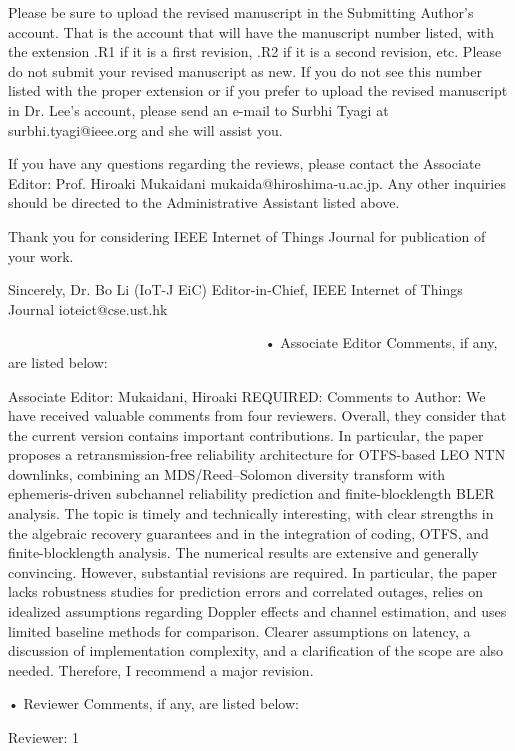 Please be sure to upload the revised manuscript in the Submitting Author's account.  That is the account that will have the manuscript number listed, with the extension .R1 if it is a first revision, .R2 if it is a second revision, etc.  Please do not submit your revised manuscript as new.  If you do not see this number listed with the proper extension or if you prefer to upload the revised manuscript in Dr. Lee's account, please send an e-mail to Surbhi Tyagi at surbhi.tyagi@ieee.org and she will assist you.

If you have any questions regarding the reviews, please contact the Associate Editor: Prof. Hiroaki Mukaidani mukaida@hiroshima-u.ac.jp. Any other inquiries should be directed to the Administrative Assistant listed above.

Thank you for considering IEEE Internet of Things Journal for publication of your work.

Sincerely,
Dr. Bo Li (IoT-J EiC)
Editor-in-Chief, IEEE Internet of Things Journal
ioteict@cse.ust.hk

~~~~~~~~~~~~~~~~~~~~~~~~~~~~~~~~~~~~
• Associate Editor Comments, if any, are listed below:

Associate Editor: Mukaidani, Hiroaki
REQUIRED: Comments to Author:
We have received valuable comments from four reviewers. Overall, they consider that the current version contains important contributions. In particular, the paper proposes a retransmission-free reliability architecture for OTFS-based LEO NTN downlinks, combining an MDS/Reed–Solomon diversity transform with ephemeris-driven subchannel reliability prediction and finite-blocklength BLER analysis. The topic is timely and technically interesting, with clear strengths in the algebraic recovery guarantees and in the integration of coding, OTFS, and finite-blocklength analysis. The numerical results are extensive and generally convincing. However, substantial revisions are required. In particular, the paper lacks robustness studies for prediction errors and correlated outages, relies on idealized assumptions regarding Doppler effects and channel estimation, and uses limited baseline methods for comparison. Clearer assumptions on latency, a discussion of implementation complexity, and a clarification of the scope are also needed. Therefore, I recommend a major revision.

• Reviewer Comments, if any, are listed below:

Reviewer: 1

